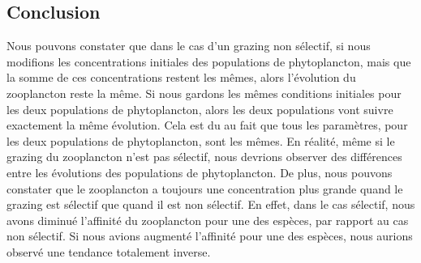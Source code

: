 \subsection{Conclusion}

Nous pouvons constater que dans le cas d'un grazing non sélectif, si nous modifions les concentrations initiales des populations de phytoplancton, mais que la somme de ces concentrations restent les mêmes, alors l'évolution du zooplancton reste la même. Si nous gardons les mêmes conditions initiales pour les deux populations de phytoplancton, alors les deux populations vont suivre exactement la même évolution. Cela est du au fait que tous les paramètres, pour les deux populations de phytoplancton, sont les mêmes. En réalité, même si le grazing du zooplancton n'est pas sélectif, nous devrions observer des différences entre les évolutions des populations de phytoplancton.
De plus, nous pouvons constater que le zooplancton a toujours une concentration plus grande quand le grazing est sélectif que quand il est non sélectif. En effet, dans le cas sélectif, nous avons diminué l'affinité du zooplancton pour une des espèces, par rapport au cas non sélectif. Si nous avions augmenté l'affinité pour une des espèces, nous aurions observé une tendance totalement inverse.
